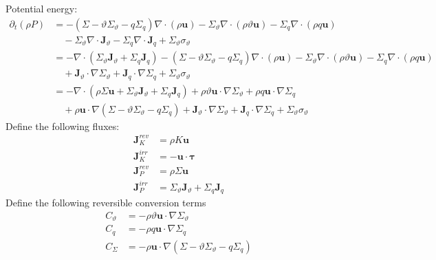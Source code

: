 \documentclass{article}
\begin{document}
Potential energy:
\begin{align}
    \partial _t (\rho P)
    & = 
    - (\Sigma - \vartheta \Sigma_\vartheta - q \Sigma_q) \nabla \cdot (\rho \mathbf{u})
    - \Sigma_\vartheta \nabla \cdot (\rho \vartheta \mathbf{u})
    - \Sigma_q \nabla \cdot (\rho q \mathbf{u})
    \nonumber
    \\
    & \quad
    - \Sigma_\vartheta \nabla \cdot \mathbf{J}_\vartheta
    - \Sigma_q \nabla \cdot  \mathbf{J}_q
    + \Sigma_\vartheta \sigma_\vartheta
    \\
    & =
    - \nabla \cdot (\Sigma_\vartheta \mathbf{J}_\vartheta + \Sigma_q \mathbf{J}_q)
    - (\Sigma - \vartheta \Sigma_\vartheta - q \Sigma_q) \nabla \cdot (\rho \mathbf{u})
    - \Sigma_\vartheta \nabla \cdot (\rho \vartheta \mathbf{u})
    - \Sigma_q \nabla \cdot (\rho q \mathbf{u})
    \nonumber
    \\
    & \quad
    + \mathbf{J}_\vartheta \cdot \nabla \Sigma_\vartheta 
    + \mathbf{J}_q \cdot  \nabla \Sigma_q
    + \Sigma_\vartheta \sigma_\vartheta
    \\
    & =
    - \nabla \cdot (
        \rho \Sigma\mathbf{u} 
        + \Sigma_\vartheta \mathbf{J}_\vartheta 
        + \Sigma_q \mathbf{J}_q
        )
    + \rho \vartheta \mathbf{u} \cdot  \nabla \Sigma_\vartheta
    + \rho q\mathbf{u} \cdot  \nabla \Sigma_q
    \nonumber
    \\
    & \quad
    + \rho \mathbf{u} \cdot  \nabla (
        \Sigma
        - \vartheta \Sigma_\vartheta
        - q \Sigma_q
        )
    + \mathbf{J}_\vartheta \cdot \nabla \Sigma_\vartheta
    + \mathbf{J}_q \cdot  \nabla \Sigma_q
    + \Sigma_\vartheta \sigma_\vartheta
\end{align}
Define the following fluxes:
\begin{align}
    \mathbf{J}^{rev}_K & = \rho K \mathbf{u} 
    \\
    \mathbf{J}^{irr}_K & = - \mathbf{u} \cdot  \boldsymbol{\tau}
    \\
    \mathbf{J}^{rev}_P & = \rho \Sigma \mathbf{u}
    \\
    \mathbf{J}^{irr}_P & = \Sigma_\vartheta \mathbf{J}_\vartheta + \Sigma_q \mathbf{J}_q
\end{align}
Define the following reversible conversion terms
\begin{align}
    C_\vartheta & = - \rho \vartheta \mathbf{u}\cdot \nabla \Sigma_\vartheta
    \\
    C_q & = - \rho q \mathbf{u}\cdot \nabla \Sigma_q
    \\
    C_\Sigma & = - \rho \mathbf{u}\cdot \nabla (
        \Sigma 
        - \vartheta \Sigma_\vartheta
        - q \Sigma_q
        )
\end{align}
\end{document}
